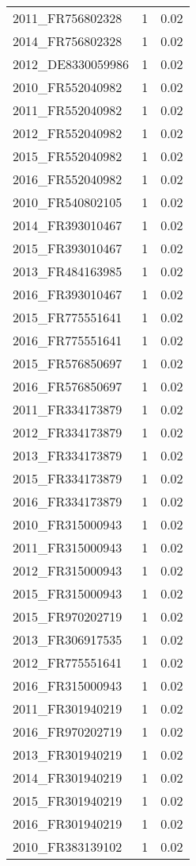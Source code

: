 \begin{table*}[htbp]
\begin{tabular}{lrr}
2011_FR756802328 & 1 & 0.02 \\
2014_FR756802328 & 1 & 0.02 \\
2012_DE8330059986 & 1 & 0.02 \\
2010_FR552040982 & 1 & 0.02 \\
2011_FR552040982 & 1 & 0.02 \\
2012_FR552040982 & 1 & 0.02 \\
2015_FR552040982 & 1 & 0.02 \\
2016_FR552040982 & 1 & 0.02 \\
2010_FR540802105 & 1 & 0.02 \\
2014_FR393010467 & 1 & 0.02 \\
2015_FR393010467 & 1 & 0.02 \\
2013_FR484163985 & 1 & 0.02 \\
2016_FR393010467 & 1 & 0.02 \\
2015_FR775551641 & 1 & 0.02 \\
2016_FR775551641 & 1 & 0.02 \\
2015_FR576850697 & 1 & 0.02 \\
2016_FR576850697 & 1 & 0.02 \\
2011_FR334173879 & 1 & 0.02 \\
2012_FR334173879 & 1 & 0.02 \\
2013_FR334173879 & 1 & 0.02 \\
2015_FR334173879 & 1 & 0.02 \\
2016_FR334173879 & 1 & 0.02 \\
2010_FR315000943 & 1 & 0.02 \\
2011_FR315000943 & 1 & 0.02 \\
2012_FR315000943 & 1 & 0.02 \\
2015_FR315000943 & 1 & 0.02 \\
2015_FR970202719 & 1 & 0.02 \\
2013_FR306917535 & 1 & 0.02 \\
2012_FR775551641 & 1 & 0.02 \\
2016_FR315000943 & 1 & 0.02 \\
2011_FR301940219 & 1 & 0.02 \\
2016_FR970202719 & 1 & 0.02 \\
2013_FR301940219 & 1 & 0.02 \\
2014_FR301940219 & 1 & 0.02 \\
2015_FR301940219 & 1 & 0.02 \\
2016_FR301940219 & 1 & 0.02 \\
2010_FR383139102 & 1 & 0.02 \\

\end{tabular}
\end{table*}
